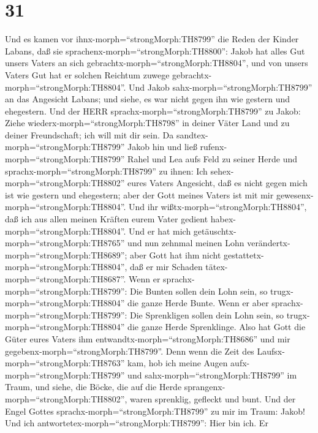 \hypertarget{section-30}{%
\section{31}\label{section-30}}

 Und es kamen vor ihnx-morph=``strongMorph:TH8799'' die
Reden der Kinder Labans, daß sie sprachenx-morph=``strongMorph:TH8800'':
Jakob hat alles Gut unsers Vaters an sich
gebrachtx-morph=``strongMorph:TH8804'', und von unsers Vaters Gut hat er
solchen Reichtum zuwege gebrachtx-morph=``strongMorph:TH8804''.
 Und Jakob sahx-morph=``strongMorph:TH8799'' an das
Angesicht Labans; und siehe, es war nicht gegen ihn wie gestern und
ehegestern.  Und der HERR
sprachx-morph=``strongMorph:TH8799'' zu Jakob: Ziehe
wiederx-morph=``strongMorph:TH8798'' in deiner Väter Land und zu deiner
Freundschaft; ich will mit dir sein.  Da
sandtex-morph=``strongMorph:TH8799'' Jakob hin und ließ
rufenx-morph=``strongMorph:TH8799'' Rahel und Lea aufs Feld zu seiner
Herde  und sprachx-morph=``strongMorph:TH8799'' zu ihnen:
Ich sehex-morph=``strongMorph:TH8802'' eures Vaters Angesicht, daß es
nicht gegen mich ist wie gestern und ehegestern; aber der Gott meines
Vaters ist mit mir gewesenx-morph=``strongMorph:TH8804''. 
Und ihr wißtx-morph=``strongMorph:TH8804'', daß ich aus allen meinen
Kräften eurem Vater gedient habex-morph=``strongMorph:TH8804''.
 Und er hat mich getäuschtx-morph=``strongMorph:TH8765'' und
nun zehnmal meinen Lohn verändertx-morph=``strongMorph:TH8689''; aber
Gott hat ihm nicht gestattetx-morph=``strongMorph:TH8804'', daß er mir
Schaden tätex-morph=``strongMorph:TH8687''.  Wenn er
sprachx-morph=``strongMorph:TH8799'': Die Bunten sollen dein Lohn sein,
so trugx-morph=``strongMorph:TH8804'' die ganze Herde Bunte. Wenn er
aber sprachx-morph=``strongMorph:TH8799'': Die Sprenkligen sollen dein
Lohn sein, so trugx-morph=``strongMorph:TH8804'' die ganze Herde
Sprenklinge.  Also hat Gott die Güter eures Vaters ihm
entwandtx-morph=``strongMorph:TH8686'' und mir
gegebenx-morph=``strongMorph:TH8799''.  Denn wenn die Zeit
des Laufsx-morph=``strongMorph:TH8763'' kam, hob ich meine Augen
aufx-morph=``strongMorph:TH8799'' und sahx-morph=``strongMorph:TH8799''
im Traum, und siehe, die Böcke, die auf die Herde
sprangenx-morph=``strongMorph:TH8802'', waren sprenklig, gefleckt und
bunt.  Und der Engel Gottes
sprachx-morph=``strongMorph:TH8799'' zu mir im Traum: Jakob! Und ich
antwortetex-morph=``strongMorph:TH8799'': Hier bin ich.  Er
